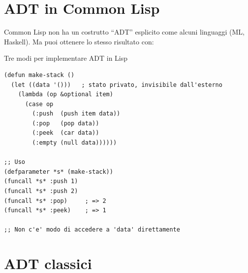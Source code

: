 \section{ADT in Common Lisp}

Common Lisp non ha un costrutto ``ADT'' esplicito come alcuni linguaggi
(ML, Haskell). Ma puoi ottenere lo stesso risultato con:

\begin{concetto}{Tre modi per implementare ADT in Lisp}
\end{concetto}

\begin{esempio}
\begin{lstlisting}
(defun make-stack ()
  (let ((data '()))   ; stato privato, invisibile dall'esterno
    (lambda (op &optional item)
      (case op
        (:push  (push item data))
        (:pop   (pop data))
        (:peek  (car data))
        (:empty (null data))))))

;; Uso
(defparameter *s* (make-stack))
(funcall *s* :push 1)
(funcall *s* :push 2)
(funcall *s* :pop)     ; => 2
(funcall *s* :peek)    ; => 1

;; Non c'e' modo di accedere a 'data' direttamente
\end{lstlisting}

\end{esempio}

\section{ADT classici}


